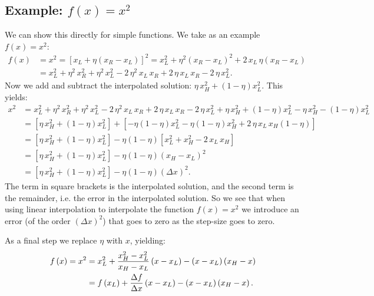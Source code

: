 \subsection{Example: $f\left(x\right)=x^{2}$}
We can show this directly for simple functions. We take as an example $f\left(x\right)=x^{2}$:
\begin{align}
    f\left(x\right)&=x^{2}=\left[x_{L}+\eta\left(x_{R}-x_{L}\right)\right]^{2}=x_{L}^{2}+\eta^{2}\left(x_{R}-x_{L}\right)^{2}+2\,x_{L}\,\eta\left(x_{R}-x_{L}\right)\\
    &=x_{L}^{2}+\eta^{2}\,x_{R}^{2}+\eta^{2}\,x_{L}^{2}-2\,\eta^{2}\,x_{L}\,x_{R}+2\,\eta\,x_{L}\,x_{R}-2\,\eta\,x_{L}^{2}.
\end{align}
Now we add and subtract the interpolated solution: $\eta\,x_{H}^{2}+\left(1-\eta\right)x_{L}^{2}$. This yields:
\begin{align}
    x^{2}&=x_{L}^{2}+\eta^{2}\,x_{R}^{2}+\eta^{2}\,x_{L}^{2}-2\,\eta^{2}\,x_{L}\,x_{R}+2\,\eta\,x_{L}\,x_{R}-2\,\eta\,x_{L}^{2}+\eta\,x_{H}^{2}+\left(1-\eta\right)x_{L}^{2}-\eta\,x_{H}^{2}-\left(1-\eta\right)x_{L}^{2}\\
    &=\left[\eta\,x_{H}^{2}+\left(1-\eta\right)x_{L}^{2}\right]+\left[-\eta\left(1-\eta\right)x_{L}^{2}-\eta\left(1-\eta\right)x_{H}^{2}+2\,\eta\,x_{L}\,x_{H}\left(1-\eta\right)\right]\\
    &=\left[\eta\,x_{H}^{2}+\left(1-\eta\right)x_{L}^{2}\right]-\eta\left(1-\eta\right)\left[x_{L}^{2}+x_{H}^{2}-2\,x_{L}\,x_{H}\right]\\
    &=\left[\eta\,x_{H}^{2}+\left(1-\eta\right)x_{L}^{2}\right]-\eta\left(1-\eta\right)\left(x_{H}-x_{L}\right)^{2}\\
    &=\left[\eta\,x_{H}^{2}+\left(1-\eta\right)x_{L}^{2}\right]-\eta\left(1-\eta\right)\left(\Delta x\right)^{2}.
\end{align}
The term in square brackets is the interpolated solution, and the second term is the remainder, i.e. the error in the interpolated solution. So we see that when using linear interpolation to interpolate the function $f\left(x\right)=x^{2}$ we introduce an error (of the order $\left(\Delta x\right)^{2}$) that goes to zero as the step-size goes to zero.

As a final step we replace $\eta$ with $x$, yielding:
\begin{align}
    f\left(x\right)=x^{2}&=x_{L}^{2}+\frac{x_{H}^{2}-x_{L}^{2}}{x_{H}-x_{L}}\left(x-x_{L}\right)-\left(x-x_{L}\right)\left(x_{H}-x\right)\\
    &=f\left(x_{L}\right)+\frac{\Delta f}{\Delta x}\left(x-x_{L}\right)-\left(x-x_{L}\right)\left(x_{H}-x\right).
\end{align}

